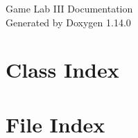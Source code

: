 \documentclass[twoside]{book}
\newcommand{\+}{\discretionary{\mbox{\scriptsize$\hookleftarrow$}}{}{}}
\newcommand{\clearemptydoublepage}{%
    \newpage{\pagestyle{empty}\cleardoublepage}%
  }
\begin{document}
  \raggedbottom
    \hypersetup{pageanchor=false,
                bookmarksnumbered=true,
                pdfencoding=unicode
               }
  \begin{titlepage}
  \vspace*{7cm}
  \begin{center}%
  {\Large Game Lab III Documentation}\\
  \vspace*{1cm}
  {\large Generated by Doxygen 1.14.0}\\
  \end{center}
  \end{titlepage}
  \clearemptydoublepage
  \tableofcontents
  \clearemptydoublepage
  \hypersetup{pageanchor=true}



\chapter{Class Index}

\chapter{File Index}

\end{document}
